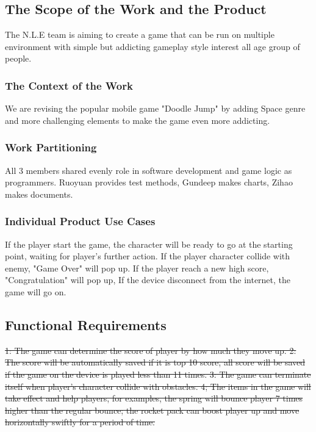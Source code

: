 \documentclass[12pt, titlepage]{article}
\begin{document}
\subsection{The Scope of the Work and the Product}
The N.L.E team is aiming to create a game that can be run on multiple environment with simple but addicting gameplay style interest all age group of people.
\subsubsection{The Context of the Work}
We are revising the popular mobile game "Doodle Jump" by adding Space  genre and more challenging elements to make the game even more addicting.

\subsubsection{Work Partitioning}
All 3 members shared evenly role in software development and game logic as programmers. Ruoyuan provides test methods, Gundeep makes charts, Zihao makes documents.

\subsubsection{Individual Product Use Cases}
If the player start the game, the character will be ready to go at the starting point, waiting for player's further action.
If the player character collide with enemy, "Game Over" will pop up.
If the player reach a new high score, "Congratulation" will pop up,
If the device disconnect from the internet, the game will go on.


\subsection{Functional Requirements}
\sout{1: The game can determine the score of player by how much they move up.
2: The score will be automatically saved if it is top 10 score, all score will be saved if the game on the device is played less than 11 times.
3: The game can terminate itself when player's character collide with obstacles.
4; The items in the game will take effect and help players, for examples, the spring will bounce player 7 times higher than the regular bounce;  the rocket pack can boost player up and move horizontally swiftly for a period of time.}\\
\end{document}
